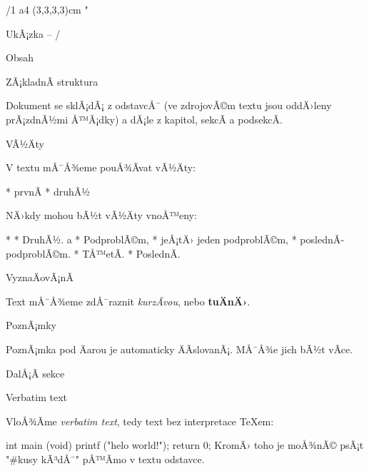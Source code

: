 \chyph                      %
\fontfam[Schola]            %
\margins/1 a4 (3,3,3,3)cm   %
\typosize[11/13]            %
\activettchar"              %
\hyperlinks\Blue\Green      %

\def\lorem{\lipsumtext[1]}  %

\def\center{\noindent\hfil} %


\tit UkÃ¡zka -- \OpTeX/

\nonum\notoc\sec Obsah

\maketoc

\sec ZÃ¡kladnÃ­ struktura

Dokument se sklÃ¡dÃ¡ z odstavcÅ¯ (ve zdrojovÃ©m textu jsou oddÄ›leny prÃ¡zdnÃ½mi Å™Ã¡dky)
a dÃ¡le z kapitol, sekcÃ­ a podsekcÃ­. \lorem

\lorem

\secc VÃ½Äty

V textu mÅ¯Å¾eme pouÅ¾Ã­vat vÃ½Äty:

\begitems
* prvnÃ­
* druhÃ½
\enditems

\lorem

NÄ›kdy mohou bÃ½t vÃ½Äty vnoÅ™eny:

\begitems
* \lorem
* DruhÃ½.
  \begitems \style a
  * PodproblÃ©m,
  * jeÅ¡tÄ› jeden podproblÃ©m,
  * poslednÃ­ podproblÃ©m.
  \enditems
* TÅ™etÃ­.
* PoslednÃ­.
\enditems
 
\lorem

\secc VyznaÄovÃ¡nÃ­

Text mÅ¯Å¾eme zdÅ¯raznit {\it kurzÃ­vou}, nebo {\bf tuÄnÄ›}. \lorem

\secc[poznamky]  PoznÃ¡mky

PoznÃ¡mka pod Äarou je automaticky ÄÃ­slovanÃ¡.
MÅ¯Å¾e jich bÃ½t vÃ­ce.
\lorem\ \lorem

\sec[dalsi] DalÅ¡Ã­ sekce

\lorem

\secc Verbatim text

VloÅ¾Ã­me {\it verbatim text}, tedy text  bez interpretace
\TeX{}em:

\begtt
int main (void) {
  printf ("helo world!\n");
  return 0;
}
\endtt
KromÄ› toho je moÅ¾nÃ© psÃ¡t "#kusy {kÃ³dÅ¯}" pÅ™Ã­mo v textu odstavce.

